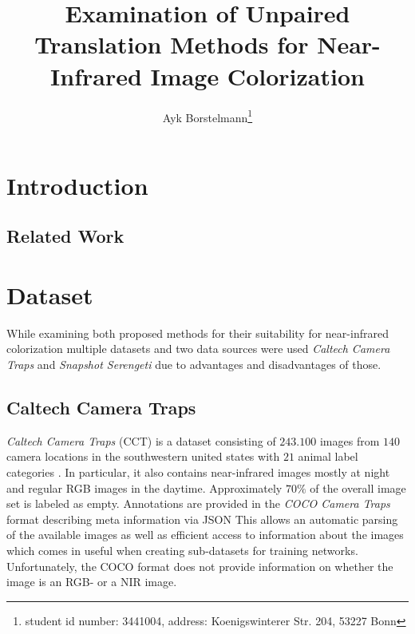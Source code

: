\documentclass[a4paper,11pt, DIV=12]{scrartcl}
\title{Examination of Unpaired Translation Methods for Near-Infrared Image Colorization}
\author{Ayk Borstelmann\footnote{student id number: 3441004, address: Koenigswinterer Str. 204, 53227 Bonn}}
\begin{document}
\maketitle

\section{Introduction}

\subsection{Related Work}




\section{Dataset}
While examining both proposed methods for their suitability for near-infrared colorization multiple datasets
and two data sources were used \textit{Caltech Camera Traps} and \textit{Snapshot Serengeti} due to advantages
and disadvantages of those.

\subsection{Caltech Camera Traps}
\textit{Caltech Camera Traps} (CCT) is a dataset consisting of $243.100$ images from $140$ camera locations
in the southwestern united states with $21$ animal label categories \cite{caltech}.
In particular, it also contains near-infrared images mostly at night and regular RGB images in the daytime.
Approximately $70 \%$ of the overall image set is labeled as empty.
Annotations are provided in the \textit{COCO Camera Traps} format describing meta information via JSON \cite{caltech}
This allows an automatic parsing of the available images as well as efficient access to information about
the images which comes in useful when creating sub-datasets for training networks.
Unfortunately, the COCO format does not provide information on whether the image is an RGB- or a NIR image.
\end{document}
